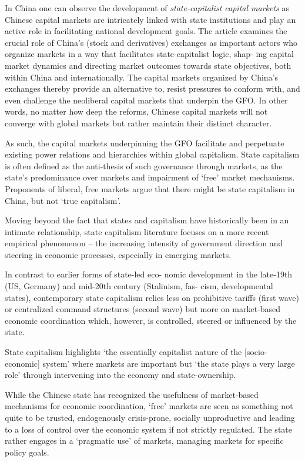 \documentclass[
]{book}
\begin{document}
In China one can observe the development of \emph{state-capitalist capital markets}
as Chinese capital markets are intricately linked with state institutions
and play an active role in facilitating national development goals.
The article examines the crucial role of China's (stock and derivatives) exchanges as
important actors who organize markets in a way that facilitates state-capitalist logic, shap-
ing capital market dynamics and directing market outcomes towards state objectives, both
within China and internationally. The capital markets organized by China's exchanges
thereby provide an alternative to, resist pressures to conform with, and even challenge
the neoliberal capital markets that underpin the GFO. In other words, no matter how
deep the reforms, Chinese capital markets will not converge with global markets but
rather maintain their distinct character.

As such, the capital markets underpinning
the GFO facilitate and perpetuate existing power relations and hierarchies within global
capitalism.
State capitalism is
often defined as the anti-thesis of such governance through markets, as the state's
predominance over markets and impairment of `free' market mechanisms.
Proponents of liberal, free markets argue that there might be state capitalism in China,
but not `true capitalism'.

Moving beyond the fact that states and capitalism have historically been in an intimate
relationship, state capitalism literature focuses on a more recent
empirical phenomenon -- the increasing intensity of government direction and steering in
economic processes, especially in emerging markets.

In contrast to earlier forms of state-led eco-
nomic development in the late-19th (US, Germany) and mid-20th century (Stalinism, fas-
cism, developmental states), contemporary state capitalism relies less on prohibitive tariffs
(first wave) or centralized command structures (second wave) but more on market-based
economic coordination which, however, is controlled, steered or influenced by the state.

State capitalism highlights `the essentially
capitalist nature of the {[}socio-economic{]} system' where markets are important but `the
state plays a very large role' through intervening into the economy and state-ownership.

While the Chinese state has recognized the usefulness of market-based mechanisms for
economic coordination, `free' markets are seen as something not quite to be
trusted, endogenously crisis-prone, socially unproductive and leading to a loss of control
over the economic system if not strictly regulated.
The state rather
engages in a `pragmatic use' of markets, managing markets for specific policy goals.
\end{document}
